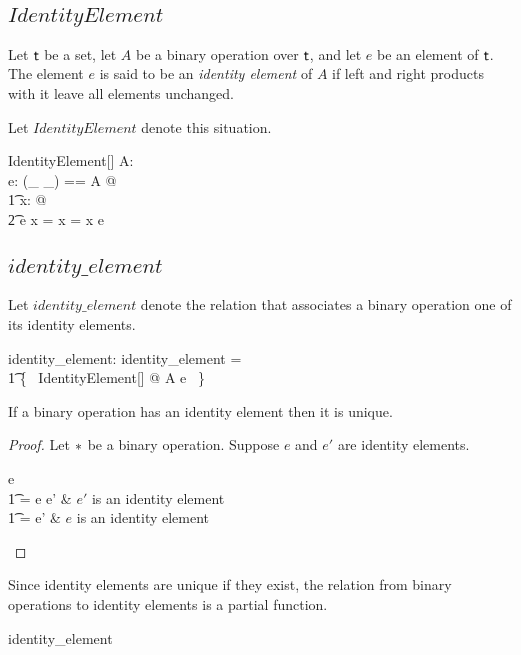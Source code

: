 \documentclass[11pt, oneside]{article}
\begin{document}
\subsection{$IdentityElement$}

Let $\mathsf{t}$ be a set, let $A$ be a binary operation over $\mathsf{t}$, and let $e$ be an element of $\mathsf{t}$.
The element $e$ is said to be an {\em identity element} of $A$ if left and right 
products with it leave all elements unchanged.

Let $IdentityElement$ denote this situation.

\begin{schema}{IdentityElement}[\genT]
A: \binop \genT \\
e: \genT
\where
\LET (\_ \mulG \_) == A @ \\
\t1	\forall x: \genT @ \\
\t2		e \mulG x = x = x \mulG e
\end{schema}

\subsection{$identity\_element$}

Let $identity\_element$ denote the relation that associates a binary operation one of its identity elements.

\begin{gendef}[\genT]
identity\_element: \binop \genT \rel \genT
\where
identity\_element = \\
\t1	\{~ IdentityElement[\genT] @ A \mapsto e ~\}
\end{gendef}

\begin{remark}
If a binary operation has an identity element then it is unique.
\end{remark}

\begin{proof}
Let $\mathbin{*}$ be a binary operation. Suppose $e$ and $e'$ are identity elements.
\begin{argue}
e \\
\t1	= e \mulG e'	& $e'$ is an identity element \\
\t1	= e'			& $e$ is an identity element
\end{argue}
\end{proof}

\begin{remark}
Since identity elements are unique if they exist, the relation from binary operations to identity elements is a partial function.

\begin{zed}
identity\_element \in \binop \setT \pfun \setT
\end{zed}

\end{remark}
\end{document}
